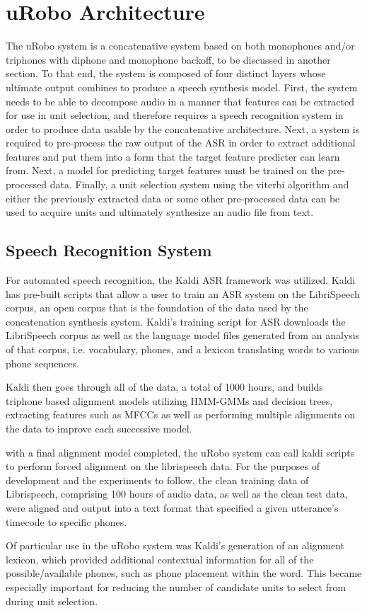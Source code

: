 \documentclass[10pt,a4paper,twocolumn]{article}
\begin{document}
\section{uRobo Architecture}
The uRobo system is a concatenative system based on both monophones and/or triphones with diphone and monophone backoff, to be discussed in another section. To that end, the system is composed of four distinct layers whose ultimate output combines to produce a speech synthesis model. First, the system needs to be able to decompose audio in a manner that features can be extracted for use in unit selection, and therefore requires a speech recognition system in order to produce data usable by the concatenative architecture. Next, a system is required to pre-process the raw output of the ASR in order to extract additional features and put them into a form that the target feature predicter can learn from. Next, a model for predicting target features must be trained on the pre-processed data. Finally, a unit selection system using the viterbi algorithm and either the previously extracted data or some other pre-processed data can be used to acquire units and ultimately synthesize an audio file from text.
\subsection{Speech Recognition System}
For automated speech recognition, the Kaldi ASR framework was utilized. Kaldi has pre-built scripts that allow a user to train an ASR system on the LibriSpeech corpus\cite{unknown}, an open corpus that is the foundation of the data used by the concatenation synthesis system. Kaldi's training script for ASR downloads the LibriSpeech corpus as well as the language model files generated from an analysis of that corpus, i.e. vocabulary, phones, and a lexicon translating words to various phone sequences.\par
Kaldi then goes through all of the data, a total of 1000 hours, and builds triphone based alignment models utilizing HMM-GMMs and decision trees, extracting features such as MFCCs as well as performing multiple alignments on the data to improve each successive model.\par
with a final alignment model completed, the uRobo system can call kaldi scripts to perform forced alignment on the librispeech data. For the purposes of development and the experiments to follow, the clean training data of Librispeech, comprising 100 hours of audio data, as well as the clean test data, were aligned and output into a text format that specified a given utterance's timecode to specific phones. \par
Of particular use in the uRobo system was Kaldi's generation of an alignment lexicon, which provided additional contextual information for all of the possible/available phones, such as phone placement within the word. This became especially important for reducing the number of candidate units to select from during unit selection.
\end{document}
